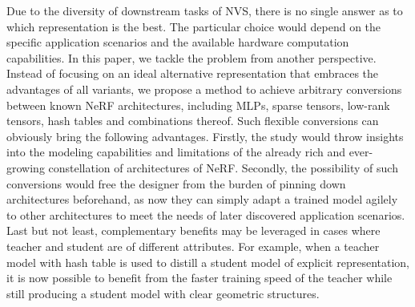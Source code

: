 \documentclass[letterpaper]{article} \usepackage{aaai23}  \usepackage{times}  \usepackage{helvet}  \usepackage{courier}  \usepackage[hyphens]{url}  \usepackage{graphicx} \urlstyle{rm} \def\UrlFont{\rm}  \usepackage{natbib}  \usepackage{caption} \frenchspacing  \setlength{\pdfpagewidth}{8.5in}  \setlength{\pdfpageheight}{11in}  \usepackage{multirow}
\begin{document}
Due to the diversity of downstream tasks of NVS, there is no single answer as to which representation is the best. The particular choice would depend on the specific application scenarios and the available hardware computation capabilities. In this paper, we tackle the problem from another perspective. Instead of focusing on an ideal alternative representation that embraces the advantages of all variants, we propose a method to achieve arbitrary conversions between known NeRF architectures, including MLPs, sparse tensors, low-rank tensors, hash tables and combinations thereof. Such flexible conversions can obviously bring the following advantages.
Firstly, the study would throw insights into the modeling capabilities and limitations of the already rich and ever-growing constellation of architectures of NeRF.
Secondly, the possibility of such conversions would free the designer from the burden of pinning down architectures beforehand, as now they can simply adapt a trained model agilely to other architectures to meet the needs of later discovered application scenarios. Last but not least, complementary benefits may be leveraged in cases where teacher and student are of different attributes. For example, when a teacher model with hash table is used to distill a student model of explicit representation, it is now possible to benefit from the faster training speed of the teacher while still producing a student model with clear geometric structures.
\end{document}
